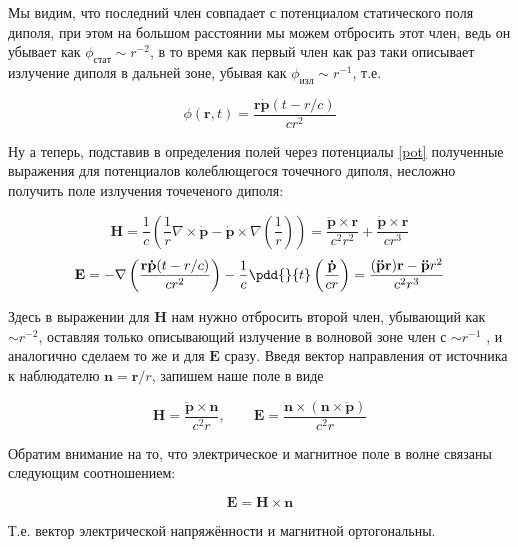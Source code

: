 \documentclass[12pt]{kiarticle}
\begin{document}
Мы видим, что последний член совпадает с потенциалом статического поля диполя, при этом на большом расстоянии мы можем отбросить этот член, ведь он убывает как $ \phi_{стат} \sim r^{-2} $, в то время как первый член как раз таки описывает излучение диполя в дальней зоне, убывая как $ \phi_{изл} \sim r^{-1} $, т.е. 

\begin{equation}\label{phi_p}
\phi (\mathbf{r}, t) =\dfrac{ \mathbf{r\dot{p}}(t - r/c)}{cr^2}
\end{equation}

Ну а теперь, подставив в определения полей через потенциалы \eqref{pot} полученные выражения для потенциалов колеблющегося точечного диполя, несложно получить поле излучения точеченого диполя:

\begin{equation}\label{}
\mathbf{H} = \dfrac{1}{c} \left( \dfrac{1}{r} \nabla \times \mathbf{\dot{p}}  - \mathbf{\dot{p}} \times \nabla \left( \dfrac{1}{r} \right) \right) = \dfrac{\mathbf{\ddot{p} \times r}}{c^2r^2} + \dfrac{\mathbf{\dot{p} \times r}}{cr^3}
\end{equation}
\begin{equation}\label{}
\mathbf{E} = - \nabla \left( \dfrac{ \mathbf{r\dot{p}}(t - r/c)}{cr^2} \right)  - \dfrac{1}{c} \pdd{}{t} \left( \dfrac{\mathbf{\dot{p}}}{cr} \right) = \dfrac{\mathbf{(\ddot{p}r)r} -\mathbf{\ddot{p}}r^2}{c^2r^3} 
\end{equation}

Здесь в выражении для $ \mathbf{H} $ нам нужно отбросить второй член, убывающий как $ \sim r^{-2} $, оставляя только описывающий излучение в волновой зоне член с $ \sim r^{-1} $ , и аналогично сделаем то же и для $ \mathbf{E} $ сразу. Введя вектор направления от источника к наблюдателю $ \mathbf{n} = \mathbf{r}/r $, запишем наше поле в виде

\begin{equation}\label{H, E, p}
\mathbf{H} = \dfrac{\mathbf{\ddot{p} \times n}}{c^2r}, \qquad \mathbf{E} = \dfrac{\mathbf{n \times (n \times \ddot{p})}}{c^2r}
\end{equation}

Обратим внимание на то, что электрическое и магнитное поле в волне связаны следующим соотношением: 

\begin{equation}\label{}
\mathbf{E} = \mathbf{H \times n}
\end{equation}

Т.е. вектор электрической напряжённости и магнитной ортогональны.
\end{document}
